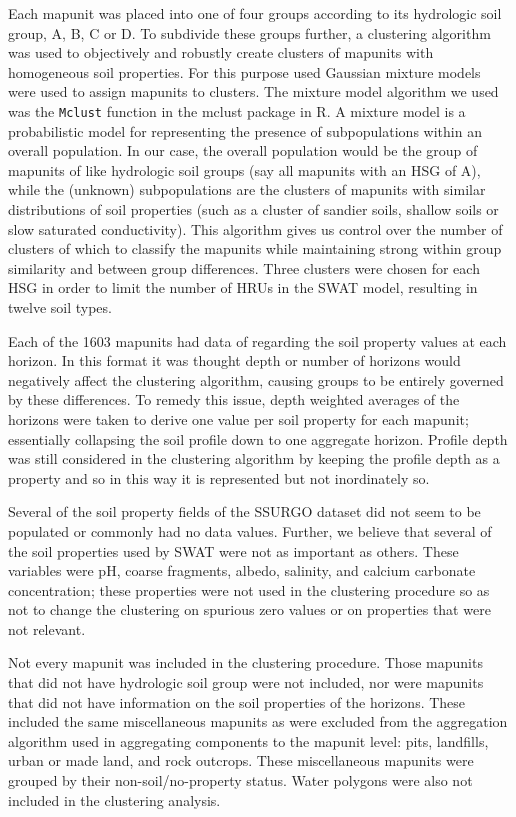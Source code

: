 Each mapunit was placed into one of four groups according to its hydrologic soil group, A, B, C or D. To subdivide these groups further, a clustering algorithm was used to objectively and robustly create clusters of mapunits with homogeneous soil properties. For this purpose used Gaussian mixture models were used to assign mapunits to clusters. The mixture model algorithm we used was the \texttt{Mclust} function in the mclust package \citep{mclust_2012} in R. A mixture model is a probabilistic model for representing the presence of subpopulations within an overall population. In our case, the overall population would be the group of mapunits of like hydrologic soil groups (say all mapunits with an HSG of A), while the (unknown) subpopulations are the clusters of mapunits with similar distributions of soil properties (such as a cluster of sandier soils, shallow soils or slow saturated conductivity). This algorithm gives us control over the number of clusters of which to classify the mapunits while maintaining strong within group similarity and between group differences. Three clusters were chosen for each HSG in order to limit the number of HRUs in the SWAT model, resulting in twelve soil types.

Each of the 1603 mapunits had data of regarding the soil property values at each horizon. In this format it was thought  depth or number of horizons would negatively affect the clustering algorithm, causing groups to be entirely governed by these differences. To remedy this issue, depth weighted averages of the horizons were taken to derive one value per soil property for each mapunit; essentially collapsing the soil profile down to one aggregate horizon. Profile depth was still considered in the clustering algorithm by keeping the profile depth as a property and so in this way it is represented but not inordinately so. 

Several of the soil property fields of the SSURGO dataset did not seem to be populated or commonly had no data values. Further, we believe that several of the soil properties used by SWAT were not as important as others. These variables were pH, coarse fragments, albedo, salinity, and calcium carbonate concentration; these properties were not used in the clustering procedure so as not to change the clustering on spurious zero values or on properties that were not relevant. 

Not every mapunit was included in the clustering procedure. Those mapunits that did not have hydrologic soil group were not included, nor were mapunits that did not have information on the soil properties of the horizons. These included the same miscellaneous mapunits as were excluded from the aggregation algorithm used in aggregating components to the mapunit level: pits, landfills, urban or made land, and rock outcrops. These miscellaneous mapunits were grouped by their non-soil/no-property status. Water polygons were also not included in the clustering analysis.

